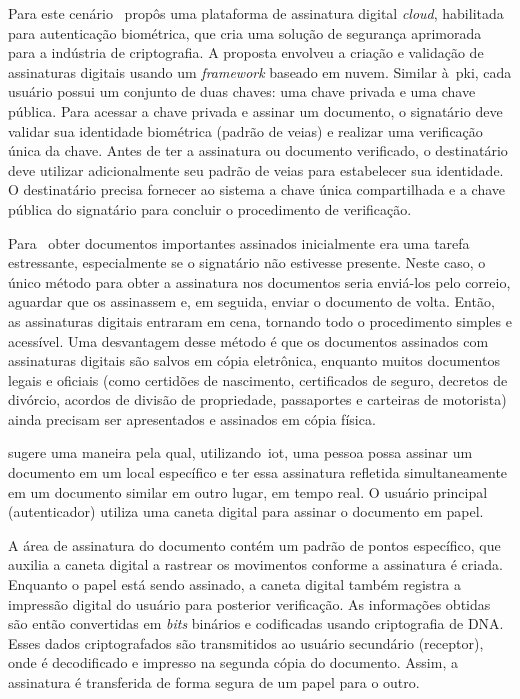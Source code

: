 Para este cenário~\textcite{chakraborty2016} propôs uma plataforma de
assinatura digital \textit{cloud}, habilitada para autenticação biométrica, que
cria uma solução de segurança aprimorada para a indústria de criptografia.
A proposta envolveu a criação e validação de assinaturas digitais usando um
\textit{framework} baseado em nuvem.
Similar à~\acrfull{pki}, cada usuário possui um conjunto de duas chaves: uma
chave privada e uma chave pública.
Para acessar a chave privada e assinar um documento, o signatário deve validar
sua identidade biométrica (padrão de veias) e realizar uma verificação única
da chave.
Antes de ter a assinatura ou documento verificado, o destinatário deve
utilizar adicionalmente seu padrão de veias para estabelecer sua identidade.
O destinatário precisa fornecer ao sistema a chave única compartilhada e a chave
pública do signatário para concluir o procedimento de verificação.

Para~\textcite{zachariah2016} obter documentos importantes assinados
inicialmente
era uma tarefa estressante, especialmente se o signatário não estivesse
presente.
Neste caso, o único método para obter a assinatura nos documentos seria
enviá-los
pelo correio, aguardar que os assinassem e, em seguida, enviar o documento de
volta.
Então, as assinaturas digitais entraram em cena, tornando todo o procedimento
simples e acessível.
Uma desvantagem desse método é que os documentos assinados com assinaturas
digitais são salvos em cópia eletrônica, enquanto muitos documentos legais e
oficiais (como certidões de nascimento, certificados de seguro, decretos de
divórcio, acordos de divisão de propriedade, passaportes e carteiras de
motorista) ainda precisam ser apresentados e assinados em cópia física\cite{
    zachariah2016}.

\textcite{zachariah2016} sugere uma maneira pela qual, utilizando~\acrfull{iot},
uma pessoa possa assinar um documento em um local específico e ter essa
assinatura
refletida simultaneamente em um documento similar em outro lugar, em tempo real.
O usuário principal (autenticador) utiliza uma caneta digital para assinar o
documento em papel.

A área de assinatura do documento contém um padrão de pontos específico, que
auxilia a caneta digital a rastrear os movimentos conforme a assinatura é
criada.
Enquanto o papel está sendo assinado, a caneta digital também registra a
impressão digital do usuário para posterior verificação.
As informações obtidas são então convertidas em \textit{bits} binários e
codificadas usando criptografia de DNA.
Esses dados criptografados são transmitidos ao usuário secundário (receptor),
onde é decodificado e impresso na segunda cópia do documento.
Assim, a assinatura é transferida de forma segura de um papel para o outro\cite{zachariah2016}.

